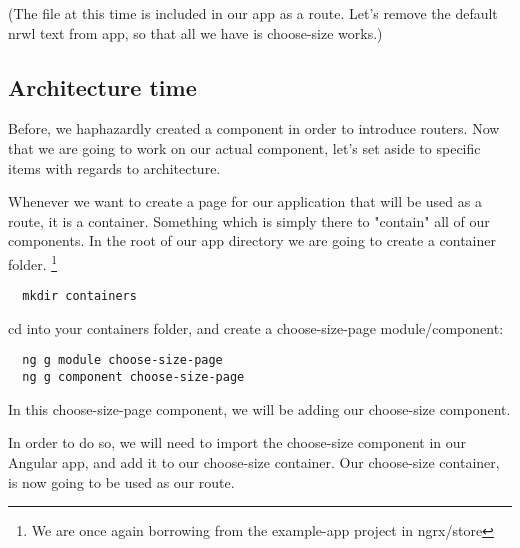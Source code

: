 (The file at this time is included in our app as a route. Let's remove the
default nrwl text from app, so that all we have is choose-size works.)

\subsection{Architecture time}

Before, we haphazardly created a component in order to introduce routers. Now
that we are going to work on our actual component, let's set aside to specific
items with regards to architecture.

Whenever we want to create a page for our application that will be used as a
route, it is a container. Something which is simply there to "contain" all of
our components. In the root of our app directory we are going to create a
container folder. \footnote{We are once again borrowing from the example-app
project in ngrx/store}

\begin{verbatim}
  mkdir containers
\end{verbatim} 

cd into your containers folder, and create a choose-size-page module/component:
\begin{verbatim}
  ng g module choose-size-page
  ng g component choose-size-page
\end{verbatim}

In this choose-size-page component, we will be adding our choose-size component.

In order to do so, we will need to import the choose-size component in our Angular
app, and add it to our choose-size container. Our choose-size container, is now
going to be used as our route.
